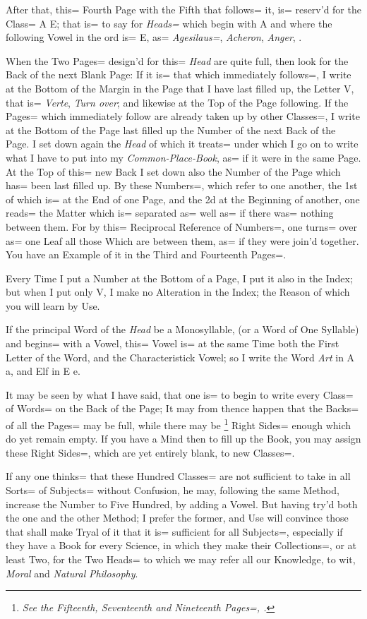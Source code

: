 After that, this= Fourth Page with the Fifth that follows= it,
is= reserv'd for the Class= A E;
that is= to say for \emph{Heads=} which begin with A and where the following Vowel in the \VV ord is= E,
as= \emph{Agesilaus=}, \emph{Acheron}, \emph{Anger}, \etc.

When the Two Pages= design'd for this= \emph{Head} are quite full,
then look for the Back of the next Blank Page:
If it is= that which immediately follows=,
I write at the Bottom of the Margin in the Page that I have last filled up,
the Letter V, that is= \emph{Verte}, \emph{Turn over};
and likewise at the Top of the Page following.
If the Pages= which immediately follow are already taken up by other Classes=,
I write at the Bottom of the Page last filled up the Number of the next Back of the Page.
I set down again the \emph{Head} of which it treats= under which I go on to write what I have to put into my \emph{Common-Place-Book},
as= if it were in the same Page.
At the Top of this= new Back I set down also the Number of the Page which has= been last filled up.
By these Numbers=, which refer to one another,
the 1st of which is= at the End of one Page,
and the 2d at the Beginning of another,
one reads= the Matter which is= separated as= well as= if there was= nothing between them.
For by this= Reciprocal Reference of Numbers=,
one turns= over as= one Leaf all those Which are between them,
as= if they were join'd together.
You have an Example of it in the Third and Fourteenth Pages=.

Every Time I put a Number at the Bottom of a Page,
I put it also in the Index;
but when I put only V, I make no Alteration in the Index;
the Reason of which you will learn by Use.

If the principal Word of the \emph{Head} be a Monosyllable,
(or a Word of One Syllable) and begins= with a Vowel,
this= Vowel is= at the same Time both the First Letter of the Word,
and the Characteristick Vowel;
so I write the Word \emph{Art} in A a, and Elf in E e.

It may be seen by what I have said,
that one is= to begin to write every Class= of Words= on the Back of the Page;
It may from thence happen that the Backs= of all the Pages= may be full,
while there may be {\footnote{\emph{See the Fifteenth, Seventeenth and Nineteenth Pages=, \etc.}}}
Right Sides= enough which do yet remain empty.
If you have a Mind then to fill up the Book, you may assign these Right Sides=,
which are yet entirely blank, to new Classes=.

If any one thinks= that these Hundred Classes= are not sufficient to take in all Sorts= of Subjects= without Confusion,
he may, following the same Method, increase the Number to Five Hundred, by adding a Vowel.
But having try'd both the one and the other Method;
I prefer the former,
and Use will convince those that shall make Tryal of it that it is= sufficient for all Subjects=,
especially if they have a Book for every Science,
in which they make their Collections=, or at least Two,
for the Two Heads= to which we may refer all our Knowledge,
to wit, \emph{Moral} and \emph{Natural} \emph{Philosophy}.

